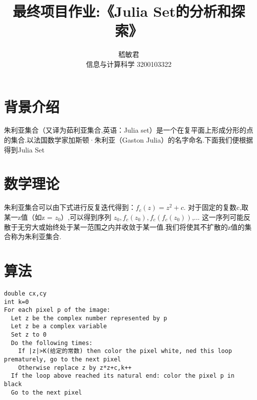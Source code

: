 \documentclass[a4paper]{ctexart}
\title{最终项目作业:《Julia Set的分析和探索》}
\author{嵇敏君 \\信息与计算科学 3200103322 }
\begin{document}
\maketitle


\section{背景介绍}
朱利亚集合（又译为茹利亚集合,英语：Julia set）是一个在复平面上形成分形的点的集合.以法国数学家加斯顿·朱利亚（Gaston Julia）的名字命名.下面我们便根据\cite{Julia}得到Julia Set

\section{数学理论}
朱利亚集合可以由下式进行反复迭代得到：$f_c(z)=z^2+c$.
对于固定的复数c,取某一z值（如z = $z_0$）,可以得到序列
$z_0,f_c(z_0),f_c(f_c(z_0))$,...
这一序列可能反散于无穷大或始终处于某一范围之内并收敛于某一值.我们将使其不扩散的z值的集合称为朱利亚集合.

\section{算法}
\begin{verbatim}
double cx,cy 
int k=0
For each pixel p of the image:
  Let z be the complex number represented by p
  Let z be a complex variable
  Set z to 0
  Do the following times:
    If |z|>K(给定的常数) then color the pixel white, ned this loop prematurely, go to the next pixel
    Otherwise replace z by z*z+c,k++
  If the loop above reached its natural end: color the pixel p in black
  Go to the next pixel
\end{verbatim}
\end{document}
